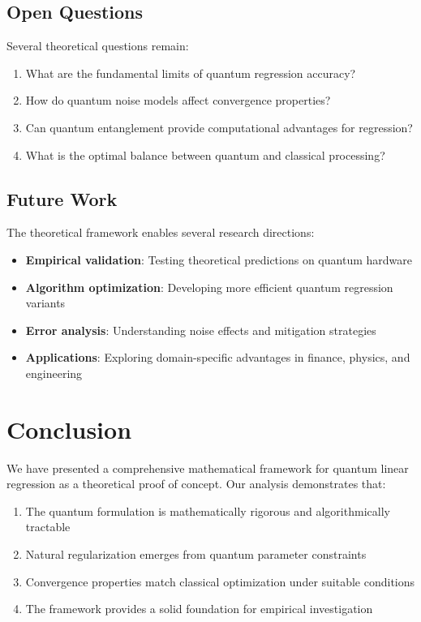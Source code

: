 \documentclass[11pt]{article}
\begin{document}
\subsection{Open Questions}

Several theoretical questions remain:

\begin{enumerate}
\item What are the fundamental limits of quantum regression accuracy?
\item How do quantum noise models affect convergence properties?
\item Can quantum entanglement provide computational advantages for regression?
\item What is the optimal balance between quantum and classical processing?
\end{enumerate}

\subsection{Future Work}

The theoretical framework enables several research directions:

\begin{itemize}
\item \textbf{Empirical validation}: Testing theoretical predictions on quantum hardware
\item \textbf{Algorithm optimization}: Developing more efficient quantum regression variants
\item \textbf{Error analysis}: Understanding noise effects and mitigation strategies
\item \textbf{Applications}: Exploring domain-specific advantages in finance, physics, and engineering
\end{itemize}

\section{Conclusion}

We have presented a comprehensive mathematical framework for quantum linear regression as a theoretical proof of concept. Our analysis demonstrates that:

\begin{enumerate}
\item The quantum formulation is mathematically rigorous and algorithmically tractable
\item Natural regularization emerges from quantum parameter constraints
\item Convergence properties match classical optimization under suitable conditions
\item The framework provides a solid foundation for empirical investigation
\end{enumerate}
\end{document}
